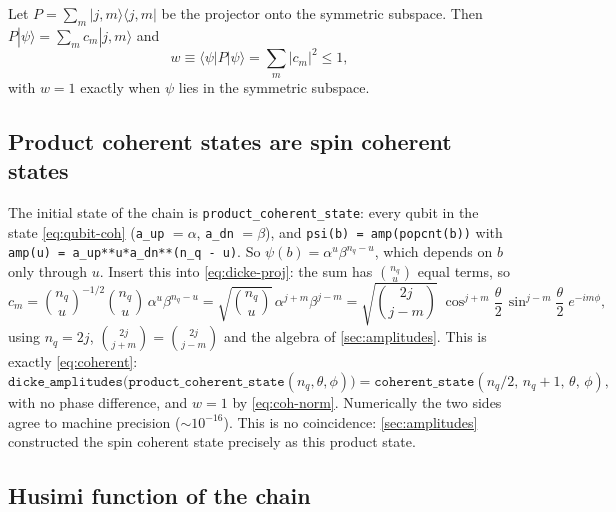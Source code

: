 \documentclass[11pt,a4paper]{article}
\begin{document}
Let $P = \sum_m|j,m\rangle\langle j,m|$ be the projector onto the symmetric subspace. Then $P|\psi\rangle = \sum_m c_m
|j,m\rangle$ and
\begin{equation}\label{eq:sym-weight}
  w \equiv \langle\psi|P|\psi\rangle = \sum_m|c_m|^2 \le 1 ,
\end{equation}
with $w = 1$ exactly when $\psi$ lies in the symmetric subspace.

\subsection{Product coherent states are spin coherent states}

The initial state of the chain is \texttt{product\_coherent\_state}: every qubit in the state \eqref{eq:qubit-coh}
(\texttt{a\_up} $=\alpha$, \texttt{a\_dn} $=\beta$), and \lstinline!psi(b) = amp(popcnt(b))! with
\lstinline!amp(u) = a_up**u*a_dn**(n_q - u)!. So $\psi(b) = \alpha^u\beta^{n_q-u}$, which depends on $b$ only through $u$. Insert this into \eqref{eq:dicke-proj}:
the sum has $\binom{n_q}{u}$ equal terms, so
\begin{equation*}
  c_m = \binom{n_q}{u}^{-1/2}\binom{n_q}{u}\,\alpha^u\beta^{n_q-u} = \sqrt{\binom{n_q}{u}}\,\alpha^{j+m}\beta^{j-m}
  = \sqrt{\binom{2j}{j-m}}\;\cos^{j+m}\!\frac\theta2\,\sin^{j-m}\!\frac\theta2\;e^{-im\phi},
\end{equation*}
using $n_q = 2j$, $\binom{2j}{j+m} = \binom{2j}{j-m}$ and the algebra of \cref{sec:amplitudes}. This is exactly
\eqref{eq:coherent}:
\begin{equation}\label{eq:prod-coh}
  \texttt{dicke\_amplitudes}\big(\texttt{product\_coherent\_state}(n_q,\theta,\phi)\big) =
  \texttt{coherent\_state}(n_q/2,\,n_q+1,\,\theta,\,\phi),
\end{equation}
with no phase difference, and $w = 1$ by \eqref{eq:coh-norm}. Numerically the two sides agree to machine precision
($\sim10^{-16}$). This is no coincidence: \cref{sec:amplitudes} constructed the spin coherent state precisely as this
product state.

\subsection{Husimi function of the chain}
\end{document}
